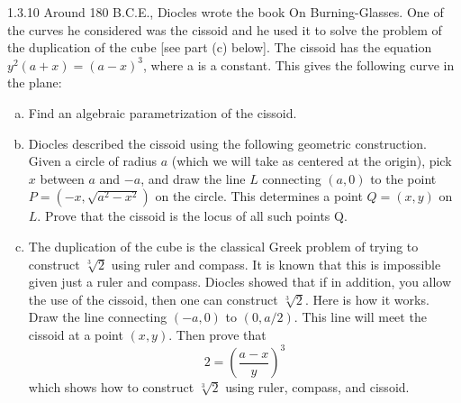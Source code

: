 \documentclass[twoside]{article}
\begin{document}
\begin{ejercicio}{1.3.10}
Around 180 B.C.E., Diocles wrote the book On Burning-Glasses. One of the curves he considered was the cissoid and he used it to solve the problem of the duplication of the cube [see part (c) below]. The cissoid has the equation $y^2(a + x) = (a − x)^3$, where a is
a constant. This gives the following curve in the plane:
\begin{enumerate}[a.]
\item Find an algebraic parametrization of the cissoid.
\item Diocles described the cissoid using the following geometric construction. Given a circle of radius $a$ (which we will take as centered at the origin), pick $x$ between $a$ and $−a$, and draw the line $L$ connecting $(a, 0)$ to the point $P = (−x,\sqrt{a^2 − x^2})$ on the
circle. This determines a point $Q = (x, y)$ on $L$. Prove that the cissoid is the locus of all such points Q.
\item The duplication of the cube is the classical Greek problem of trying to construct $\sqrt[3]{2}$ using ruler and compass. It is known that this is impossible given just a ruler and  compass. Diocles showed that if in addition, you allow the use of the cissoid, then
one can construct $\sqrt[3]{2}$. Here is how it works. Draw the line connecting $(−a, 0)$ to $(0, a/2)$. This line will meet the cissoid at a point $(x, y)$. Then prove that
$$
2=\left(\frac{a-x}{y}\right)^3
$$
which shows how to construct $\sqrt[3]{2}$ using ruler, compass, and cissoid.
\end{enumerate}
\end{ejercicio}
\end{document}

